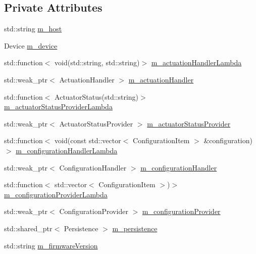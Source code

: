 \subsection*{Private Attributes}
\begin{DoxyCompactItemize}
\item 
std\+::string \hyperlink{classwolkabout_1_1_wolk_builder_ad3b00189d917cc82cd557c8cf8062d10}{m\+\_\+host}
\item 
Device \hyperlink{classwolkabout_1_1_wolk_builder_a6e2dd1cd616595f362f8c43667c6998e}{m\+\_\+device}
\item 
std\+::function$<$ void(std\+::string, std\+::string)$>$ \hyperlink{classwolkabout_1_1_wolk_builder_acfce1c54da60e8dc9943b0ab45e27e20}{m\+\_\+actuation\+Handler\+Lambda}
\item 
std\+::weak\+\_\+ptr$<$ Actuation\+Handler $>$ \hyperlink{classwolkabout_1_1_wolk_builder_a3631d60ed3c07bcf1ad46b28ddd3570a}{m\+\_\+actuation\+Handler}
\item 
std\+::function$<$ Actuator\+Status(std\+::string)$>$ \hyperlink{classwolkabout_1_1_wolk_builder_a004905693c244d1616f0ee9fc79f1e0d}{m\+\_\+actuator\+Status\+Provider\+Lambda}
\item 
std\+::weak\+\_\+ptr$<$ Actuator\+Status\+Provider $>$ \hyperlink{classwolkabout_1_1_wolk_builder_a7de9ca5dcb65a67e9c245bc8d928a91f}{m\+\_\+actuator\+Status\+Provider}
\item 
std\+::function$<$ void(const std\+::vector$<$ Configuration\+Item $>$ \&configuration)$>$ \hyperlink{classwolkabout_1_1_wolk_builder_a1d8ed6ff181db71100a627520933fb4b}{m\+\_\+configuration\+Handler\+Lambda}
\item 
std\+::weak\+\_\+ptr$<$ Configuration\+Handler $>$ \hyperlink{classwolkabout_1_1_wolk_builder_ae0103becc951fbb1da1364e9d6f34907}{m\+\_\+configuration\+Handler}
\item 
std\+::function$<$ std\+::vector$<$ Configuration\+Item $>$)$>$ \hyperlink{classwolkabout_1_1_wolk_builder_a524126a80e618c3a4e51b9f0fa249a5c}{m\+\_\+configuration\+Provider\+Lambda}
\item 
std\+::weak\+\_\+ptr$<$ Configuration\+Provider $>$ \hyperlink{classwolkabout_1_1_wolk_builder_af2e250ac23c4c706aee4e4526efe3413}{m\+\_\+configuration\+Provider}
\item 
std\+::shared\+\_\+ptr$<$ Persistence $>$ \hyperlink{classwolkabout_1_1_wolk_builder_a11719e49b1cb83d0d94bf32bfd85af9a}{m\+\_\+persistence}
\item 
std\+::string \hyperlink{classwolkabout_1_1_wolk_builder_a4b70436b72943ab920d3c9400a66657c}{m\+\_\+firmware\+Version}

\end{DoxyCompactItemize}
